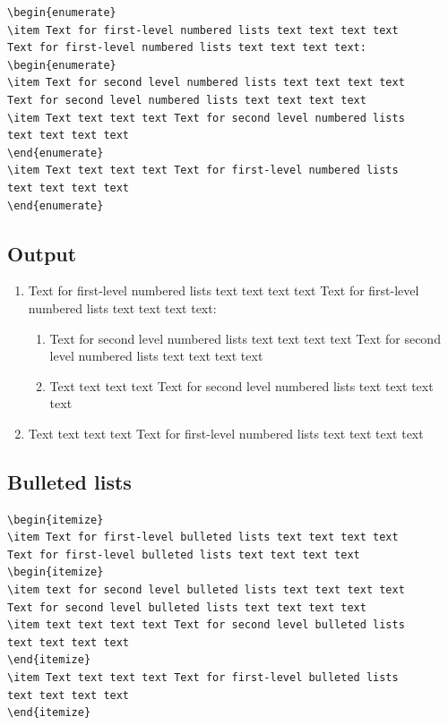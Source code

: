 \documentclass[]{imag-ms-template}
\begin{document}
\begin{verbatim}
\begin{enumerate}
\item Text for first-level numbered lists text text text text
Text for first-level numbered lists text text text text: 
\begin{enumerate}
\item Text for second level numbered lists text text text text
Text for second level numbered lists text text text text 
\item Text text text text Text for second level numbered lists
text text text text 
\end{enumerate}
\item Text text text text Text for first-level numbered lists
text text text text 
\end{enumerate}
\end{verbatim}

\subsection*{Output}

\begin{enumerate}
\item Text for first-level numbered lists text text text text Text for first-level numbered lists text text text text: 
\begin{enumerate}
\item Text for second level numbered lists text text text text Text for second level numbered lists text text text text 
\item Text text text text Text for second level numbered lists text text text text 
\end{enumerate}
\item Text text text text Text for first-level numbered lists text text text text 
\end{enumerate}

\subsection*{Bulleted lists}

\begin{verbatim}
\begin{itemize}
\item Text for first-level bulleted lists text text text text
Text for first-level bulleted lists text text text text 
\begin{itemize}
\item text for second level bulleted lists text text text text
Text for second level bulleted lists text text text text 
\item text text text text Text for second level bulleted lists
text text text text 
\end{itemize}
\item Text text text text Text for first-level bulleted lists
text text text text 
\end{itemize}
\end{verbatim}
\end{document}
